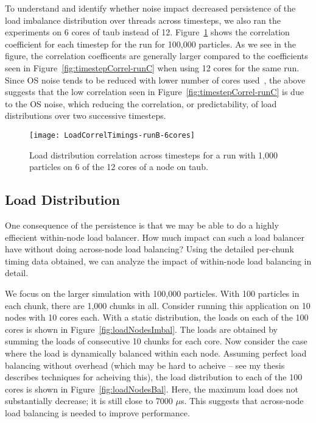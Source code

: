 \documentclass[11pt]{article}
\begin{document}
To understand and identify whether noise impact decreased persistence
of the load imbalance distribution over threads across timesteps, we
also ran the experiments on 6 cores of taub instead of
12. Figure~\ref{fig:LoadCorrelTimings-runB-6cores} 
shows the correlation coefficient for each timestep for the run for
100,000 particles. As we see in the figure, the correlation coefficents
are generally larger compared to the coefficients seen in
Figure~\ref{fig:timestepCorrel-runC} when using 12 cores for the
same run. Since OS noise tends to be reduced with lower number of
cores used~\cite{crayNoise}, the above suggests that the low
correlation seen in Figure~\ref{fig:timestepCorrel-runC} is due to
the OS noise, which reducing the correlation, or predictability, of load
distributions over two successive timesteps. 

\begin{figure}[ht!]
\label{fig:LoadCorrelTimings-runB-6cores}
\begin{center}
\texttt{[image: LoadCorrelTimings-runB-6cores]}
\end{center}
\caption{\label{fig:LoadCorrelTimings-runB-6cores} Load distribution 
correlation across timesteps for a run with 1,000 particles on 6 of
the 12 cores of a node on taub.}
\end{figure}

\subsection{Load Distribution}  

One consequence of the persistence is that we may be able to do a
highly effiecient within-node load balancer. How much impact can such
a load balancer have without doing across-node load balancing? 
Using the detailed per-chunk timing data obtained, we can analyze the
impact of within-node load balancing in detail.  

We focus on the larger simulation with 100,000 particles.
With 100 particles in each chunk, there are 1,000 chunks in all. 
Consider running this application on 10 nodes with 10 cores
each. With a static distribution, the loads on each of the 100 cores is shown
in Figure~\ref{fig:loadNodesImbal}. The loads are obtained by summing the loads of consecutive 10 chunks for each core. Now consider the case where the
load is dynamically balanced within each node. Assuming perfect load
balancing without overhead (which may be hard to acheive -- see my
thesis describes techniques for acheiving this), the load distribution to
each of the 100 cores is shown in Figure~\ref{fig:loadNodesBal}. Here, the maximum load does not substantially decrease; it is still close to 7000
$\mu$s. This suggests that across-node load balancing is needed to
improve performance.
\end{document}
